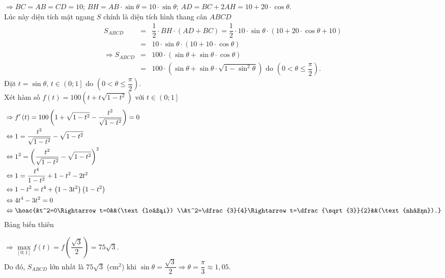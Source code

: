 \begin{bt}
{\begin{center}
\begin{tikzpicture}[line join = round, line cap = round,>=stealth,font=\footnotesize,scale=1]
		\end{tikzpicture}\end{center}
		$\Rightarrow BC=AB=CD=10$; $BH=AB\cdot\sin \theta =10\cdot\sin \theta$; $AD=BC+2AH=10+20\cdot\cos \theta $.\\
		Lúc này diện tích mặt ngang $S$ chính là diện tích hình thang cân $ABCD$
		\allowdisplaybreaks
		\begin{eqnarray*}
			S_{ABCD}&=&\dfrac{1}{2}\cdot BH\cdot \left(AD+BC\right)=\dfrac{1}{2}\cdot 10\cdot \sin \theta \cdot \left(10+20\cdot \cos \theta +10\right)\\
			&=&10\cdot \sin \theta \cdot \left(10+10\cdot \cos \theta\right)\\
			\Rightarrow {S_{ABCD}}&=&100\cdot \left(\sin \theta +\sin \theta\cdot \cos \theta\right)\\
			&=&100\cdot \left(\sin \theta +\sin \theta\cdot \sqrt{1-\sin^2\theta}\right)\text{ do }\left(0<\theta \le \dfrac{\pi}{2}\right).
		\end{eqnarray*}
		Đặt $t=\sin \theta,\,t\in \left(0;1\right]$ do $\left(0<\theta \le \dfrac{\pi}{2}\right)$.\\
		Xét hàm số $f\left(t\right)=100\left(t+t\sqrt{1-t^2}\right)$ với $t\in \left(0;1\right]$
		$$\begin{aligned}
			& \Rightarrow f'\left(t\right)=100\left(1+\sqrt{1-t^2}-\dfrac{t^2}{\sqrt{1-t^2}}\right)=0 \\
			& \Leftrightarrow 1=\dfrac{t^2}{\sqrt{1-t^2}}-\sqrt{1-t^2} \\
			& \Leftrightarrow{1^2}=\left(\dfrac{t^2}{\sqrt{1-t^2}}-\sqrt{1-t^2}\right)^2 \\
			& \Leftrightarrow 1=\dfrac{t^4}{1-t^2}+1-t^2-2t^2 \\
			& \Leftrightarrow 1-t^2=t^4+\left(1-3t^2\right)\left(1-t^2\right) \\
			& \Leftrightarrow 4t^4-3t^2=0 \\
			& \Leftrightarrow \hoac{&t^2=0\Rightarrow t=0&&(\text{loại}) \\&t^2=\dfrac{3}{4}\Rightarrow t=\dfrac{\sqrt{3}}{2}&&(\text{nhận}).} \\
		\end{aligned}$$
		Bảng biến thiên
		\begin{center}
		\end{center}
		$\Rightarrow \max\limits_{\left[0;1\right]}f\left(t\right)=f\left(\dfrac{\sqrt{3}}{2}\right)=75\sqrt{3}$.\\
		Do đó, $S_{ABCD}$ lớn nhất là $75\sqrt{3}$ (cm$^2$) khi $\sin \theta =\dfrac{\sqrt{3}}{2}\Rightarrow \theta =\dfrac{\pi}{3}\approx 1{,}05$.
	}
\end{bt}

